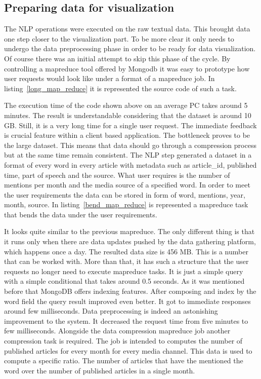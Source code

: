 \subsection{Preparing data for visualization}
The NLP operations were executed on the raw textual data. This brought data one step closer to the visualization part. To be more clear it only needs to undergo the data preprocessing phase in order to be ready for data visualization. Of course there was an initial attempt to skip this phase of the cycle. By controlling a mapreduce tool offered by Mongodb it was easy to prototype how user requests would look like under a format of a mapreduce job. In \mbox{listing \ref{long_map_reduce}} it is represented the source code of such a task.



The execution time of the code shown above on an average PC takes around 5 minutes. The result is understandable considering that the dataset is around 10 GB. Still, it is a very long time for a single user request. The immediate feedback is crucial feature within a client based application. The bottleneck proves to be the large dataset. This means that data should go through a compression process but at the same time remain consistent. The NLP step generated a dataset in a format of every word in every article with metadata such as article\_id, published time, part of speech and the source. What user requires is the number of mentions per month and the media source of a specified word. In order to meet the user requirements the data can be stored in form of  {word, mentions, year, month, source}. In \mbox{listing \ref{bend_map_reduce}} is represented a mapreduce task that bends the data under the user requirements.



It looks quite similar to the previous mapreduce. The only different thing is that it runs only when there are data updates pushed by the data gathering platform, which happens once a day. The resulted data size is 456 MB. This is a number that can be worked with. More than that, it has such a structure that the user requests no longer need to execute mapreduce tasks. It is just a simple query with a simple conditional that takes around 0.5 seconds. As it was mentioned before that MongoDB offers indexing features. After composing and index by the word field the query result improved even better. It got to immediate responses around few milliseconds. Data preprocessing is indeed an astonishing improvement to the system. It decreased the request time from five minutes to few milliseconds. Alongside the data compression mapreduce job another compression task is required. The job is intended to computes the number of published articles for every month for every media channel. This data is used to compute a specific ratio. The number of articles that have the mentioned the word over the number of published articles in a single month.

